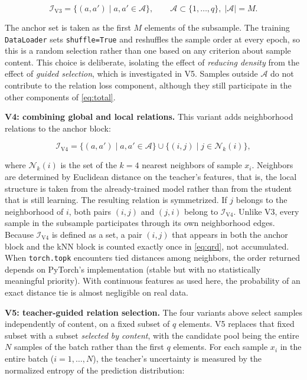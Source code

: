 \begin{equation}
\label{eq:i-v3}
\mathcal{I}_{\mathrm{V3}} = \{(a,a') \mid a, a' \in \mathcal{A}\},
\qquad \mathcal{A} \subset \{1,\ldots,q\}, \; |\mathcal{A}| = M.
\end{equation}

The anchor set is taken as the first $M$ elements of the subsample.
The training \texttt{DataLoader} sets \texttt{shuffle=True} and
reshuffles the sample order at every epoch, so this is a random
selection rather than one based on any criterion about sample
content. This choice is deliberate, isolating the effect of
\emph{reducing density} from the effect of \emph{guided selection},
which is investigated in V5. Samples outside $\mathcal{A}$ do not
contribute to the relation loss component, although they still
participate in the other components of \eqref{eq:total}.

\textbf{V4: combining global and local relations.} This variant adds
neighborhood relations to the anchor block:

\begin{equation}
\label{eq:i-v4}
\mathcal{I}_{\mathrm{V4}} = \{(a,a') \mid a,a' \in \mathcal{A}\}
  \cup \{(i,j) \mid j \in \mathcal{N}_k(i)\},
\end{equation}

where $\mathcal{N}_k(i)$ is the set of the $k = 4$ nearest neighbors
of sample $x_i$. Neighbors are determined by Euclidean distance on
the teacher's features, that is, the local structure is taken from
the already-trained model rather than from the student that is still
learning. The resulting relation is symmetrized. If $j$ belongs to
the neighborhood of $i$, both pairs $(i,j)$ and $(j,i)$ belong to
$\mathcal{I}_{\mathrm{V4}}$. Unlike V3, every sample in the subsample
participates through its own neighborhood edges. Because
$\mathcal{I}_{\mathrm{V4}}$ is defined as a set, a pair $(i,j)$ that
appears in both the anchor block and the kNN block is counted
exactly once in \eqref{eq:qrd}, not accumulated. When
\texttt{torch.topk} encounters tied distances among neighbors, the
order returned depends on PyTorch's implementation (stable but with
no statistically meaningful priority). With continuous features as
used here, the probability of an exact distance tie is almost
negligible on real data.

\textbf{V5: teacher-guided relation selection.} The four variants
above select samples independently of content, on a fixed subset of
$q$ elements. V5 replaces that fixed subset with a subset
\emph{selected by content}, with the candidate pool being the entire
$N$ samples of the batch rather than the first $q$ elements. For
each sample $x_i$ in the entire batch ($i = 1,\ldots,N$), the
teacher's uncertainty is measured by the normalized entropy of the
prediction distribution:

